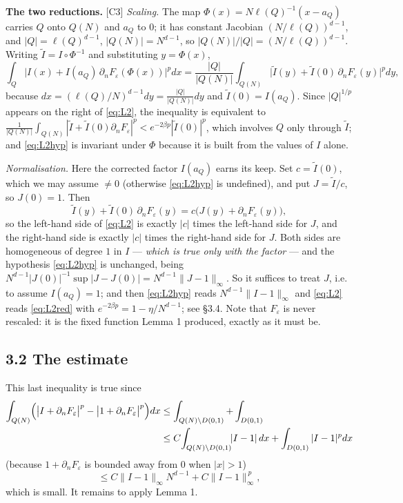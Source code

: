 \documentclass[11pt,reqno]{amsart}
\theoremstyle{plain}
\theoremstyle{definition}
\theoremstyle{plain}
\theoremstyle{definition}
\theoremstyle{remark}
\newcommand{\nd}{\partial_n}
\newcommand{\Ledger}[1]{{\scriptsize\textsf{[#1]}}}
\begin{document}
\begin{expansion}
\textbf{The two reductions.} \Ledger{C3}
\emph{Scaling.} The map $\Phi(x)=N\ell(Q)^{-1}(x-a_Q)$ carries $Q$ onto $Q(N)$ and
$a_Q$ to $0$; it has constant Jacobian $(N/\ell(Q))^{d-1}$, and
$|Q|=\ell(Q)^{d-1}$, $|Q(N)|=N^{d-1}$, so $|Q(N)|/|Q|=(N/\ell(Q))^{d-1}$. Writing
$\tilde I=I\circ\Phi^{-1}$ and substituting $y=\Phi(x)$,
\[\int_Q\bigl|I(x)+I(a_Q)\,\nd F_\varepsilon(\Phi(x))\bigr|^pdx
 =\frac{|Q|}{|Q(N)|}\int_{Q(N)}
   \bigl|\tilde I(y)+\tilde I(0)\,\nd F_\varepsilon(y)\bigr|^pdy ,\]
because $dx=(\ell(Q)/N)^{d-1}dy=\frac{|Q|}{|Q(N)|}dy$ and $\tilde I(0)=I(a_Q)$.
Since $|Q|^{1/p}$ appears on the right of \eqref{eq:L2}, the inequality is
equivalent to
$\frac1{|Q(N)|}\int_{Q(N)}|\tilde I+\tilde I(0)\nd F_\varepsilon|^p
 <e^{-2\beta p}|\tilde I(0)|^p$,
which involves $Q$ only through $\tilde I$; and \eqref{eq:L2hyp} is invariant under
$\Phi$ because it is built from the values of $I$ alone.

\emph{Normalisation.} Here the corrected factor $I(a_Q)$ earns its keep. Set
$c=\tilde I(0)$, which we may assume $\ne0$ (otherwise \eqref{eq:L2hyp} is
undefined), and put $J=\tilde I/c$, so $J(0)=1$. Then
\[\tilde I(y)+\tilde I(0)\,\nd F_\varepsilon(y)
   =c\bigl(J(y)+\nd F_\varepsilon(y)\bigr),\]
so the left-hand side of \eqref{eq:L2} is exactly $|c|$ times the left-hand side for
$J$, and the right-hand side is exactly $|c|$ times the right-hand side for $J$.
Both sides are homogeneous of degree $1$ in $I$ --- \emph{which is true only with
the factor} --- and the hypothesis \eqref{eq:L2hyp} is unchanged, being
$N^{d-1}|J(0)|^{-1}\sup|J-J(0)|=N^{d-1}\|J-1\|_\infty$. So it suffices to treat
$J$, i.e. to assume $I(a_Q)=1$; and then \eqref{eq:L2hyp} reads
$N^{d-1}\|I-1\|_\infty$ and \eqref{eq:L2} reads \eqref{eq:L2red} with
$e^{-2\beta p}=1-\eta/N^{d-1}$; see \S3.4. Note that $F_\varepsilon$ is never
rescaled: it is the fixed function Lemma 1 produced, exactly as it must be.
\end{expansion}

\subsection*{3.2 The estimate}

This last inequality is true since
\begin{align}
 \int_{Q(N)}\Bigl(\bigl|I+\nd F_\varepsilon\bigr|^p
   -\bigl|1+\nd F_\varepsilon\bigr|^p\Bigr)dx
 &\le\int_{Q(N)\setminus D(0,1)}+\int_{D(0,1)} \notag\\
 &\le C\!\int_{Q(N)\setminus D(0,1)}\!\!|I-1|\,dx
   +\int_{D(0,1)}|I-1|^p dx \label{eq:L2chain}
\end{align}
(because $1+\nd F_\varepsilon$ is bounded away from $0$ when $|x|>1$)
\[\le C\|I-1\|_\infty N^{d-1}+C\|I-1\|_\infty^{\,p},\]
which is small. It remains to apply Lemma 1.
\end{document}
